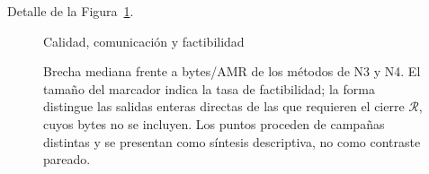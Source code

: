 





Detalle de la Figura~\ref{fig:pareto}.

\begin{figure}[H]\centering
{}
{Calidad, comunicación y factibilidad}
\caption{Brecha mediana frente a bytes/AMR de los métodos de N3 y N4. El tamaño
del marcador indica la tasa de factibilidad; la forma distingue las salidas
enteras directas de las que requieren el cierre $\mathcal R$, cuyos bytes no se
incluyen. Los puntos proceden de campañas distintas y se presentan como síntesis
descriptiva, no como contraste pareado.}
\label{fig:pareto}
\viuownsource
\end{figure}
